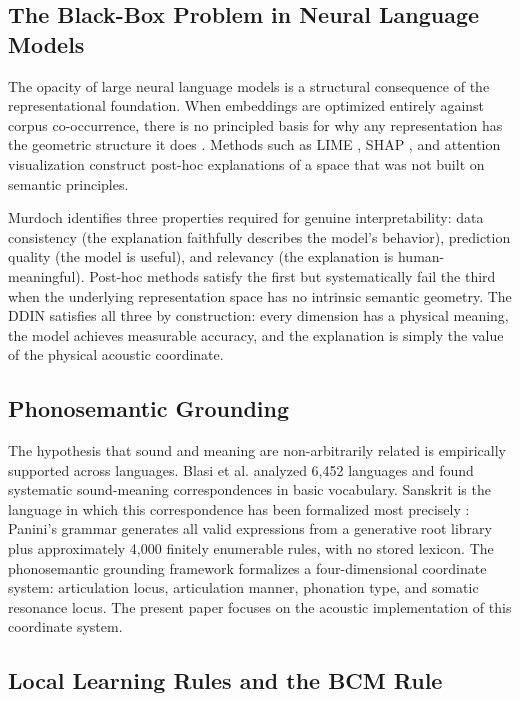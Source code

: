 \documentclass{article}
\begin{document}
\subsection{The Black-Box Problem in Neural Language Models}

The opacity of large neural language models is a structural consequence of the representational foundation. When embeddings are optimized entirely against corpus co-occurrence, there is no principled basis for why any representation has the geometric structure it does \cite{rudin2019, arrieta2020}. Methods such as LIME \cite{ribeiro2016}, SHAP \cite{lundberg2017}, and attention visualization \cite{gilpin2018} construct post-hoc explanations of a space that was not built on semantic principles.

Murdoch \cite{murdoch2019} identifies three properties required for genuine interpretability: data consistency (the explanation faithfully describes the model's behavior), prediction quality (the model is useful), and relevancy (the explanation is human-meaningful). Post-hoc methods satisfy the first but systematically fail the third when the underlying representation space has no intrinsic semantic geometry. The DDIN satisfies all three by construction: every dimension has a physical meaning, the model achieves measurable accuracy, and the explanation is simply the value of the physical acoustic coordinate.

\subsection{Phonosemantic Grounding}

The hypothesis that sound and meaning are non-arbitrarily related \cite{saussure1916} is empirically supported across languages. Blasi et al. \cite{blasi2016} analyzed 6,452 languages and found systematic sound-meaning correspondences in basic vocabulary. Sanskrit is the language in which this correspondence has been formalized most precisely \cite{cardona1997}: Panini's grammar \cite{panini500bce} generates all valid expressions from a generative root library plus approximately 4,000 finitely enumerable rules, with no stored lexicon. The phonosemantic grounding framework \cite{kumar2026phonosemantic} formalizes a four-dimensional coordinate system: articulation locus, articulation manner, phonation type, and somatic resonance locus. The present paper focuses on the acoustic implementation of this coordinate system.

\subsection{Local Learning Rules and the BCM Rule}
\end{document}
